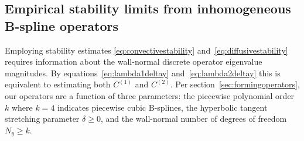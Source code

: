 \documentclass[letterpaper,11pt,nointlimits,reqno,draft]{amsbook}
\begin{document}
\subsection{Empirical stability limits from inhomogeneous B-spline operators}
\label{sec:wallnormaleigval}

Employing stability estimates \eqref{eq:convectivestability}
and~\eqref{eq:diffusivestability} requires information about the wall-normal
discrete operator eigenvalue magnitudes.  By equations~\eqref{eq:lambda1deltay}
and~\eqref{eq:lambda2deltay} this is equivalent to estimating both $C^{(1)}$
and $C^{(2)}$.  Per section~\ref{sec:formingoperators}, our operators are a
function of three parameters: the piecewise polynomial order $k$ where $k=4$
indicates piecewise cubic B-splines, the hyperbolic tangent stretching
parameter $\delta\geq{}0$, and the wall-normal number of degrees of freedom
$N_y\geq{}k$.
\end{document}
